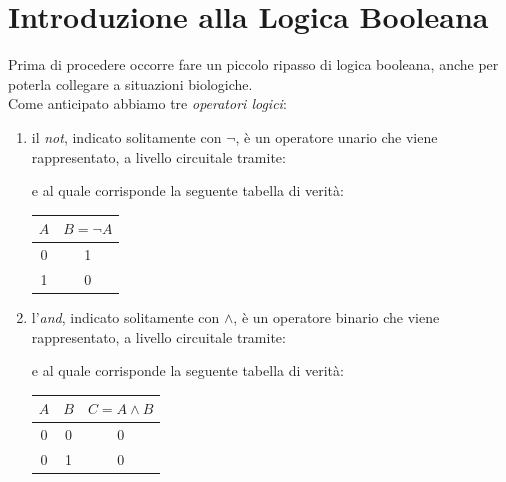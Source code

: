\documentclass[a4paper,12pt, oneside]{book}
\begin{document}
\section{Introduzione alla Logica Booleana}
Prima di procedere occorre fare un piccolo ripasso di logica booleana, anche per
poterla collegare a situazioni biologiche.\\
Come anticipato abbiamo tre \textit{operatori logici}:
\begin{enumerate}
  \item il \textit{not}, indicato solitamente con $\neg$, è un operatore unario
  che viene rappresentato, a livello circuitale tramite:
  \begin{center}
  \end{center}
  e al quale corrisponde la seguente tabella di verità:
  \begin{table}[H]
    \small
    \centering
    \begin{tabular}{c|c}
      $A$&$B=\neg A$\\
      \hline
      0 & 1 \\
      1 & 0
    \end{tabular}
  \end{table}
  \item l'\textit{and}, indicato solitamente con $\land$, è un operatore binario
  che viene rappresentato, a livello circuitale tramite:
  \begin{center}
  \end{center}
  e al quale corrisponde la seguente tabella di verità:
  \begin{table}[H]
    \small
    \centering
    \begin{tabular}{c|c|c}
      $A$&$B$&$C=A\land B$\\
      \hline
      0 & 0 & 0 \\
      0 & 1 & 0\\

\end{tabular}
\end{table}
\end{enumerate}
\end{document}
